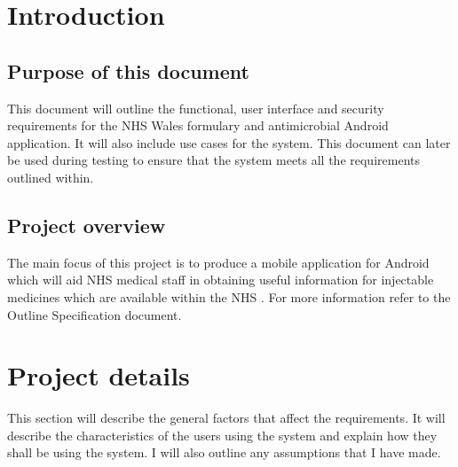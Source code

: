 \documentclass[11pt,fleqn,twoside]{article}
\begin{document}
\wordcount{}

\mmp

\setcounter{tocdepth}{3} %


\section{Introduction}
\subsection{Purpose of this document}
This document will outline the functional, user interface and security requirements for the NHS Wales formulary and antimicrobial Android application. It will also include use cases for the system. This document can later be used during testing to ensure that the system meets all the requirements outlined within.


\subsection{Project overview}
The main focus of this project is to produce a mobile application for Android which will aid NHS medical staff in obtaining useful information for injectable medicines which are available within the NHS . For more information refer to the Outline Specification document.


\section{Project details}
This section will describe the general factors that affect the requirements. It will describe the characteristics of the users using the system and explain how they shall be using the system. I will also outline any assumptions that I have made.
\end{document}
